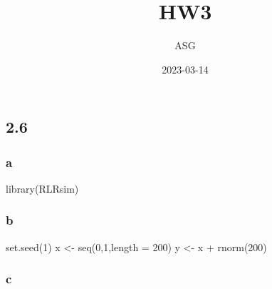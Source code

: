 \documentclass[
]{article}
\title{HW3}
\author{ASG}
\date{2023-03-14}
\newenvironment{Shaded}{\begin{snugshade}}{\end{snugshade}}
\newcommand{\AttributeTok}[1]{\textcolor[rgb]{0.77,0.63,0.00}{#1}}
\newcommand{\DecValTok}[1]{\textcolor[rgb]{0.00,0.00,0.81}{#1}}
\newcommand{\FunctionTok}[1]{\textcolor[rgb]{0.00,0.00,0.00}{#1}}
\newcommand{\NormalTok}[1]{#1}
\newcommand{\OtherTok}[1]{\textcolor[rgb]{0.56,0.35,0.01}{#1}}
\newcommand{\SpecialCharTok}[1]{\textcolor[rgb]{0.00,0.00,0.00}{#1}}
\newcommand{\StringTok}[1]{\textcolor[rgb]{0.31,0.60,0.02}{#1}}
\begin{document}
\maketitle

\hypertarget{section}{%
\subsection{2.6}\label{section}}

\hypertarget{a}{%
\subsubsection{a}\label{a}}

\begin{Shaded}
\begin{Highlighting}[]
\FunctionTok{library}\NormalTok{(RLRsim)}
\end{Highlighting}
\end{Shaded}

\hypertarget{b}{%
\subsubsection{b}\label{b}}

\begin{Shaded}
\begin{Highlighting}[]
\FunctionTok{set.seed}\NormalTok{(}\DecValTok{1}\NormalTok{)}
\NormalTok{x }\OtherTok{\textless{}{-}} \FunctionTok{seq}\NormalTok{(}\DecValTok{0}\NormalTok{,}\DecValTok{1}\NormalTok{,}\AttributeTok{length =} \DecValTok{200}\NormalTok{)}
\NormalTok{y }\OtherTok{\textless{}{-}}\NormalTok{ x }\SpecialCharTok{+} \FunctionTok{rnorm}\NormalTok{(}\DecValTok{200}\NormalTok{)}
\end{Highlighting}
\end{Shaded}

\hypertarget{c}{%
\subsubsection{c}\label{c}}

\begin{Shaded}
\end{Shaded}
\end{document}
